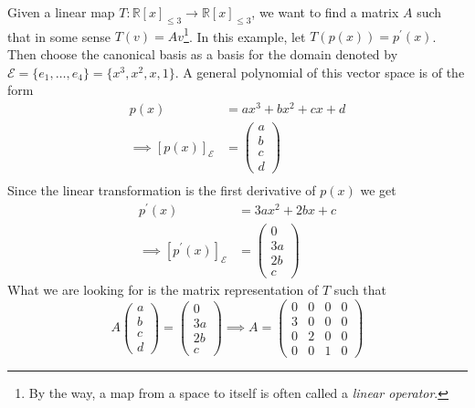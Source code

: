 \begin{exm}
	Given a linear map $T:\mathbb{R}[x]_{\leq3}\to\mathbb{R}[x]_{\leq3}$, we want to find a matrix
	$A$ such that in some sense $T(v)=Av$\footnote{By the way, a map from a space
		to itself is often called a \textit{linear operator}.}. In this example, let
	$T(p(x))=p^\prime(x)$. Then choose the canonical basis as a basis for the domain
	denoted by $\mathcal{E}=\{e_1,\dots,e_4\}=\{x^3,x^2,x,1\}$. A general polynomial
	of this vector space is of the form
	\begin{align*}
		p(x)                       & =ax^3 + bx^2 + cx + d        \\
		\implies[p(x)]_\mathcal{E} & =\begin{pmatrix}
			a \\ b \\ c \\ d
		\end{pmatrix} \\
	\end{align*}
	Since the linear transformation is the first derivative of $p(x)$ we get
	\begin{align*}
		p^\prime(x)                        & =3ax^2+2bx + c               \\
		\implies [p^\prime(x)]_\mathcal{E} & =\begin{pmatrix}
			0 \\ 3a \\ 2b \\ c
		\end{pmatrix}
	\end{align*}
	What we are looking for is the matrix representation of $T$ such that
	\begin{equation*}
		A\begin{pmatrix}
			a \\ b \\ c \\ d
		\end{pmatrix}=\begin{pmatrix}
			0 \\ 3a \\ 2b \\ c
		\end{pmatrix}\implies A=\begin{pmatrix}
			0 & 0 & 0 & 0 \\
			3 & 0 & 0 & 0 \\
			0 & 2 & 0 & 0 \\
			0 & 0 & 1 & 0
		\end{pmatrix}
	\end{equation*}

\end{exm}
